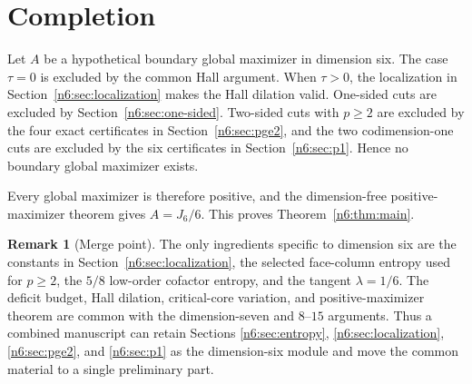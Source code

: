 \documentclass[11pt]{article}
\numberwithin{equation}{section}
\theoremstyle{definition}
\newtheorem{remark}[theorem]{Remark}
\begin{document}
\section{Completion}\label{n6:sec:completion}

Let $A$ be a hypothetical boundary global maximizer in dimension six.  The
case $\tau=0$ is excluded by the common Hall argument.  When $\tau>0$, the
localization in Section~\ref{n6:sec:localization} makes the Hall dilation
valid.  One-sided cuts are excluded by Section~\ref{n6:sec:one-sided}.
Two-sided cuts with $p\ge2$ are excluded by the four exact certificates in
Section~\ref{n6:sec:pge2}, and the two codimension-one cuts are excluded by the
six certificates in Section~\ref{n6:sec:p1}.  Hence no boundary global
maximizer exists.

Every global maximizer is therefore positive, and the dimension-free
positive-maximizer theorem gives $A=J_6/6$.  This proves
Theorem~\ref{n6:thm:main}.

\begin{remark}[Merge point]\label{n6:rem:merge}
The only ingredients specific to dimension six are the constants in
Section~\ref{n6:sec:localization}, the selected face-column entropy used for
$p\ge2$, the $5/8$ low-order cofactor entropy, and the tangent
$\lambda=1/6$.  The deficit budget, Hall dilation, critical-core variation,
and positive-maximizer theorem are common with the dimension-seven and
$8$--$15$ arguments.  Thus a combined manuscript can retain Sections
\ref{n6:sec:entropy}, \ref{n6:sec:localization},
\ref{n6:sec:pge2}, and \ref{n6:sec:p1} as the dimension-six module and move
the common material to a single preliminary part.
\end{remark}
\end{document}
